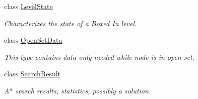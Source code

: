 \begin{DoxyCompactItemize}
class \hyperlink{classboxedin_1_1LevelState}{Level\+State}
\begin{DoxyCompactList}\small\item\em Characterizes the state of a Boxed In level. \end{DoxyCompactList}\item 
class \hyperlink{classboxedin_1_1OpenSetData}{Open\+Set\+Data}
\begin{DoxyCompactList}\small\item\em This type contains data only needed while node is in open set. \end{DoxyCompactList}\item 
class \hyperlink{classboxedin_1_1SearchResult}{Search\+Result}
\begin{DoxyCompactList}\small\item\em A$\ast$ search results, statistics, possibly a solution. \end{DoxyCompactList}\end{DoxyCompactItemize}

